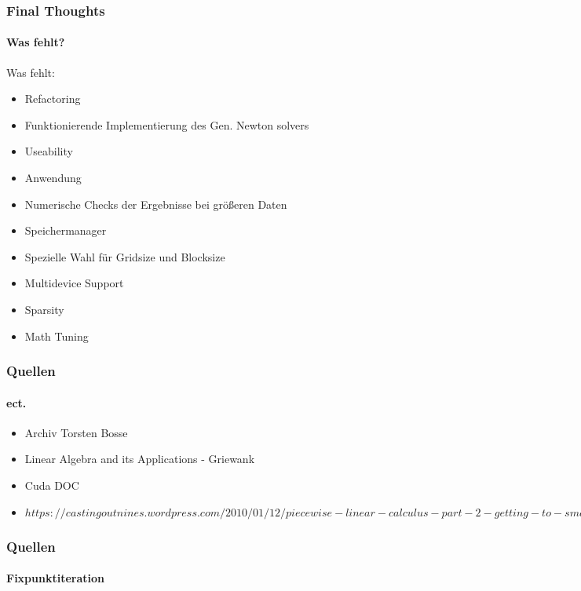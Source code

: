\begin{frame}
	\frametitle{Final Thoughts}
	\framesubtitle{Was fehlt?}
	Was fehlt:
	\begin{itemize}
		\item <2-> Refactoring
		\item <3-> Funktionierende Implementierung des Gen. Newton solvers
		\item <4->Useability
		\item <5-> Anwendung
		\item <6->Numerische Checks der Ergebnisse bei größeren Daten
		\item <7-> Speichermanager
		\item <8-> Spezielle Wahl für Gridsize und Blocksize
		\item <9-> Multidevice Support
		\item <10-> Sparsity
		\item <11-> Math Tuning
	\end{itemize}
\end{frame}
\begin{frame}
	\frametitle{Quellen}
	\framesubtitle{ect.}
	\begin{itemize}
		\item Archiv Torsten Bosse
		\item Linear Algebra and its Applications - Griewank
		\item Cuda DOC
		\item $https://castingoutnines.wordpress.com/2010/01/12/piecewise-linear-calculus-part-2-getting-to-smoothness/$
	\end{itemize}
	
\end{frame}
\begin{frame}
	\frametitle{Quellen}
	\framesubtitle{Fixpunktiteration}
	\begin{center}
	\end{center}
\end{frame}